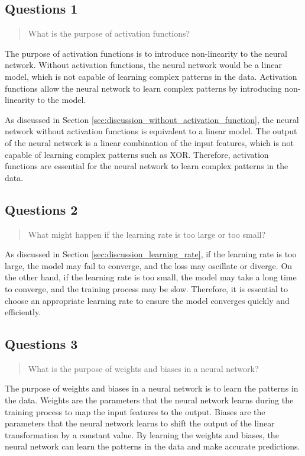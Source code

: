 \subsection{Questions 1}

\begin{quote}
    What is the purpose of activation functions?
\end{quote}

The purpose of activation functions is to introduce non-linearity to the neural network. Without activation functions, the neural network would be a linear model, which is not capable of learning complex patterns in the data. Activation functions allow the neural network to learn complex patterns by introducing non-linearity to the model.

As discussed in Section \ref{sec:discussion_without_activation_function}, the neural network without activation functions is equivalent to a linear model.
The output of the neural network is a linear combination of the input features, which is not capable of learning complex patterns such as XOR.
Therefore, activation functions are essential for the neural network to learn complex patterns in the data.


\subsection{Questions 2}

\begin{quote}
    What might happen if the learning rate is too large or too small?
\end{quote}

As discussed in Section \ref{sec:discussion_learning_rate}, if the learning rate is too large, the model may fail to converge, and the loss may oscillate or diverge.
On the other hand, if the learning rate is too small, the model may take a long time to converge, and the training process may be slow.
Therefore, it is essential to choose an appropriate learning rate to ensure the model converges quickly and efficiently.

\subsection{Questions 3}

\begin{quote}
    What is the purpose of weights and biases in a neural network?
\end{quote}

The purpose of weights and biases in a neural network is to learn the patterns in the data.
Weights are the parameters that the neural network learns during the training process to map the input features to the output.
Biases are the parameters that the neural network learns to shift the output of the linear transformation by a constant value.
By learning the weights and biases, the neural network can learn the patterns in the data and make accurate predictions.
